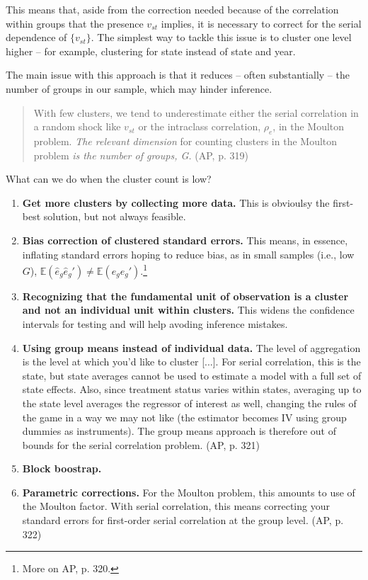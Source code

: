 \documentclass[11pt, a4paper]{report}
\theoremstyle{plain}
\theoremstyle{plain}
\theoremstyle{remark}
\begin{document}
This means that, aside from the correction needed because of the correlation within groups that the presence $v_{st}$ implies, it is necessary to correct for the serial dependence of $\{v_{st}\}$. The simplest way to tackle this issue is to cluster one level higher -- for example, clustering for state instead of state and year.

The main issue with this approach is that it reduces -- often substantially -- the number of groups in our sample, which may hinder inference. 

\begin{quote}
    With few clusters, we tend to underestimate
either the serial correlation in a random shock like $v_{st}$ or the intraclass correlation, $\rho_e$, in the Moulton problem. \textit{The relevant dimension} for counting clusters in the Moulton problem
\textit{is the number of groups, G.} (AP, p. 319)
\end{quote}

What can we do when the cluster count is low?
\begin{enumerate}
    \item \textbf{Get more clusters by collecting more data.} This is obvioulsy the first-best solution, but not always feasible. 
    \item \textbf{Bias correction of clustered standard errors.} This means, in essence, inflating standard errors hoping to reduce bias, as in small samples (i.e., low $G$), $\mathbb{E}(\hat{e}_g\hat{e}_g') \neq \mathbb{E}({e}_g{e}_g')$.\footnote{More on AP, p. 320.}
    \item \textbf{Recognizing that the fundamental unit of observation is a
    cluster and not an individual unit within clusters.} This widens the confidence intervals for testing and will help avoding inference mistakes.
    \item \textbf{Using group means instead of individual data.} The level of aggregation is the level
    at which you’d like to cluster [...]. For serial correlation, this is the state, but
    state averages cannot be used to estimate a model with a
    full set of state effects. Also, since treatment status varies
    within states, averaging up to the state level averages the
    regressor of interest as well, changing the rules of the game
    in a way we may not like (the estimator becomes IV using
    group dummies as instruments). The group means approach
    is therefore out of bounds for the serial correlation problem. (AP, p. 321)
    \item \textbf{Block boostrap.}
    \item \textbf{Parametric corrections.} For the Moulton problem, this
    amounts to use of the Moulton factor. With serial correlation, this means correcting your standard errors for
    first-order serial correlation at the group level. (AP, p. 322)
\end{enumerate}
\end{document}
